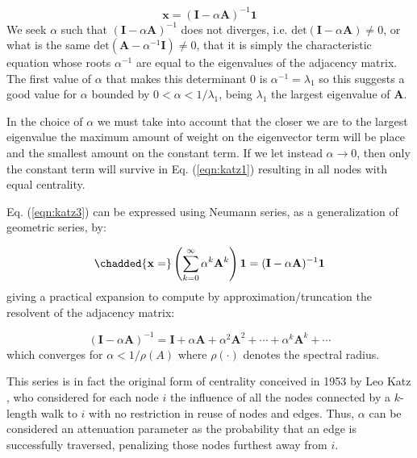 \begin{equation}
\label{eqn:katz3}
    \mathbf{x} = (\mathbf{I}-\alpha\mathbf{A})^{-1}\mathbf{1}
\end{equation}
We seek $\alpha$ such that $(\mathbf{I}-\alpha\mathbf{A})^{-1}$ does not diverges, i.e. $\text{det}(\mathbf{I}-\alpha\mathbf{A})\neq 0$, or what is the same $\text{det}(\mathbf{A}-\alpha^{-1}\mathbf{I})\neq 0$, that it is simply the characteristic equation whose roots $\alpha^{-1}$ are equal to the eigenvalues of the adjacency matrix. The first value of $\alpha$ that makes this determinant $0$ is $\alpha^{-1}=\lambda_1$ so this suggests a good value for $\alpha$ bounded by $0 < \alpha < 1/\lambda_1 $, being $\lambda_1$ the largest eigenvalue of $\mathbf{A}$. 


In the choice of $\alpha$ we must take into account that the closer we are to the largest eigenvalue the maximum amount of weight on the eigenvector term will be place and the smallest amount on the constant term. If we let instead $\alpha\to 0$, then only the constant term will survive in Eq. (\ref{eqn:katz1}) resulting in all nodes with equal centrality.

Eq. (\ref{eqn:katz3}) can be expressed using Neumann series, as a generalization of geometric series, by: 

\begin{equation}
\label{eqn:katz4}
    \chadded{\mathbf{x} = }\left(\sum_{k=0}^{\infty}\alpha^k \mathbf{A}^k\right)\mathbf{1} = (\mathbf{I}-\alpha\mathbf{A})^{-1}\mathbf{1}
\end{equation}
giving a practical expansion to compute by approximation/truncation the resolvent of the adjacency matrix:

\begin{equation}
\label{eqn:katz5}
    (\mathbf{I}-\alpha\mathbf{A})^{-1} = \mathbf{I} + \alpha\mathbf{A} + \alpha^2\mathbf{A}^2 + \cdots + \alpha^k\mathbf{A}^k + \cdots
\end{equation}
which converges for $\alpha<1/\rho(A)$ where $\rho(\cdot)$ denotes the spectral radius. 

This series is in fact the original form of centrality conceived in 1953 by Leo Katz  \cite{katz1953new}, who considered for each node $i$ the influence of all the nodes connected by a $k$-length walk to $i$ with no restriction in reuse of nodes and edges. Thus, $\alpha$ can be considered an attenuation parameter as the probability that an edge is successfully traversed, penalizing those nodes furthest away from $i$. 

